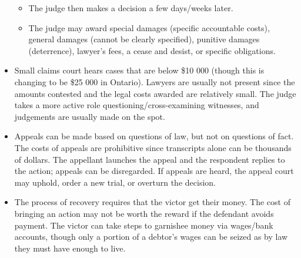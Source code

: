 \documentclass{article}
\begin{document}
\begin{itemize}
\begin{itemize}
            \item The judge then makes a decision a few days/weeks later.
            \item The judge may award special damages (specific accountable costs), general damages (cannot be clearly specified), punitive damages (deterrence), lawyer's fees, a cease and desist, or specific obligations.
        \end{itemize}
    \item Small claims court hears cases that are below \$10 000 (though this is changing to be \$25 000 in Ontario).  Lawyers are usually not present since the amounts contested and the legal costs awarded are relatively small.  The judge takes a more active role questioning/cross-examining witnesses, and judgements are usually made on the spot.
    \item Appeals can be made based on questions of law, but not on questions of fact.  The costs of appeals are prohibitive since transcripts alone can be thousands of dollars.  The appellant launches the appeal and the respondent replies to the action; appeals can be disregarded.  If appeals are heard, the appeal court may uphold, order a new trial, or overturn the decision.
    \item The process of recovery requires that the victor get their money.  The cost of bringing an action may not be worth the reward if the defendant avoids payment.  The victor can take steps to garnishee money via wages/bank accounts, though only a portion of a debtor's wages can be seized as by law they must have enough to live.
\end{itemize}
\end{document}
